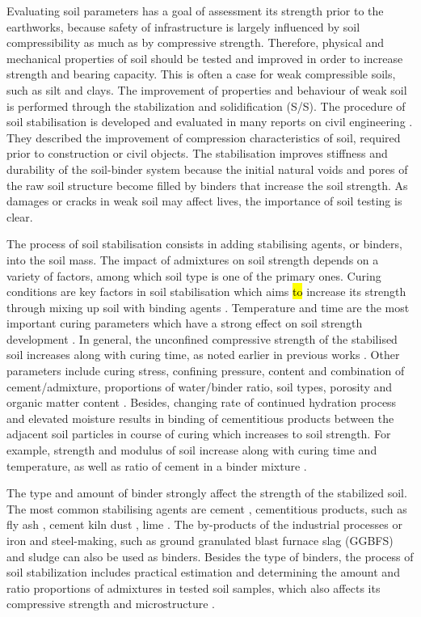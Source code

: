 \documentclass{amestyle}
\begin{document}
Evaluating soil parameters has a goal of assessment its strength prior to the earthworks, because safety of infrastructure is largely influenced by soil compressibility as much as by compressive strength. Therefore, physical and mechanical properties of soil should be tested and improved in order to increase strength and bearing capacity. This is often a case for weak compressible soils, such as silt and clays. The improvement of properties and behaviour of weak soil is performed through the stabilization and solidification (S/S). The procedure of soil stabilisation is developed and evaluated in many reports on civil engineering \cite{Jauberthie,Lindh202102,ArabiWild,Lindh2004}. They described the improvement of compression characteristics of soil, required prior to construction or civil objects. The stabilisation improves stiffness and durability of the soil-binder system because the initial natural voids and pores of the raw soil structure become filled by binders that increase the soil strength. As damages or cracks in weak soil may affect lives, the importance of soil testing is clear. 

The process of soil stabilisation consists in adding stabilising agents, or binders, into the soil mass. The impact of admixtures on soil strength depends on a variety of factors, among which soil type is one of the primary ones. Curing conditions are key factors in soil stabilisation which aims \hl{to} increase its strength through mixing up soil with binding agents \cite{LiuStarcher,Oliveiraetal2012,Ghasemzadeh}. Temperature and time are the most important curing parameters which have a strong effect on soil strength development \cite{Aldaood,Yuetal2017,Oh}. In general, the unconfined compressive strength of the stabilised soil increases along with curing time, as noted earlier in previous works \cite{Howard,Lindh202102,Consoli}. Other parameters include curing stress, confining pressure, content and combination of cement/admixture, proportions of water/binder ratio, soil types, porosity and organic matter content \cite{Rabbi,CHAIYAPUT2022e01082,Lindh2022,AMADI2018305}. Besides, changing rate of continued hydration process and elevated moisture results in binding of cementitious products between the adjacent soil particles in course of curing which increases to soil strength. For example, strength and modulus of soil increase along with curing time and temperature, as well as ratio of cement in a binder mixture \cite{Wangetal2017}. 

The type and amount of binder strongly affect the strength of the stabilized soil. The most common stabilising agents are cement \cite{Rekik}, cementitious products, such as fly ash \cite{Tastan,Hasan}, cement kiln dust \cite{Solanki,Lindh2021a}, lime \cite{ARULRAJAH2017999,BIAN20211124,ANDAVAN20201125,INDIRAMMA2020694}. The by-products of the industrial processes or iron and steel-making, such as ground granulated blast furnace slag (GGBFS) \cite{Mozejko} and sludge \cite{Ingunza,Sharif} can also be used as binders. Besides the type of binders, the process of soil stabilization includes practical estimation and determining the amount and ratio proportions of admixtures in tested soil samples, which also affects its compressive strength and microstructure \cite{Lindh2001,Ahmed}.
\end{document}
